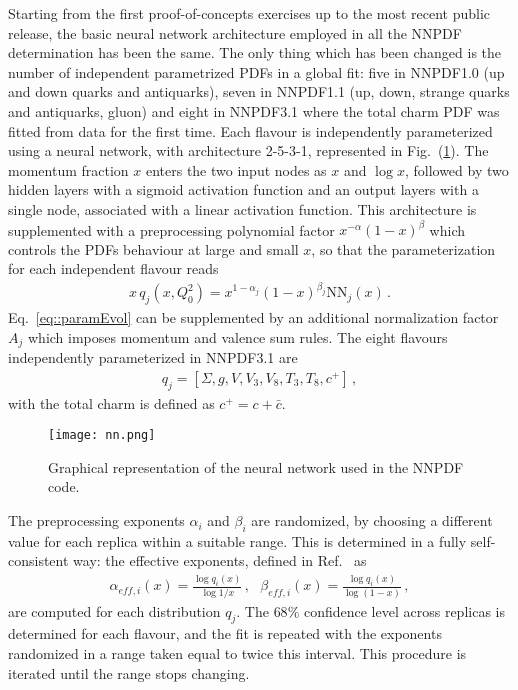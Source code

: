 %
Starting from the first proof-of-concepts exercises up to the most recent public release, the basic
neural network architecture employed in all the NNPDF determination has been the same.
The only thing which has been changed is the number of independent parametrized PDFs in a global fit:
five in NNPDF1.0 (up and down quarks and antiquarks), 
seven in NNPDF1.1 (up, down, strange quarks and antiquarks, gluon) and eight in NNPDF3.1
where the total charm PDF was fitted from data for the first time.
Each flavour is independently parameterized using a neural network,
with architecture 2-5-3-1, represented in Fig.~(\ref{nn}). 
The momentum fraction $x$ enters the two input nodes as $x$ and $\log{x}$, followed by two hidden layers with a sigmoid activation function and an output layers with a single node, 
associated with a linear activation function. 
This architecture is supplemented with a preprocessing polynomial factor $x^{-\alpha}\left(1-x\right)^{\beta}$ which controls the PDFs behaviour
at large and small $x$, so that the parameterization for each independent flavour reads
\begin{align}
	\label{eq::paramEvol}
	x\,q_j\left(x, Q_0^2\right) = x^{1-\alpha_{j}}\left(1-x\right)^{\beta_{j}}\text{NN}_{j}\left(x\right)\,.
\end{align}
Eq.~\eqref{eq::paramEvol} can be supplemented by an additional normalization factor $A_j$ which imposes momentum
and valence sum rules. The eight flavours independently parameterized in NNPDF3.1 are 
\begin{align}
    \label{eq:nnpdf31IC_basis}
    q_j = \left[\Sigma, g, V, V_3, V_8, T_3, T_8, c^+ \right]\,,
\end{align} 
with the total charm is defined as $c^+ = c +\bar{c}$.
\begin{figure}[htb]     
	\begin{center}
		\texttt{[image: nn.png]}
	\end{center}
	\caption{Graphical representation of the neural network used in the NNPDF code.}
	\label{nn}                 
\end{figure}
The preprocessing exponents $\alpha_i$ and $\beta_i$ are randomized, by choosing a different value for each replica
within a suitable range. This is determined in a fully self-consistent way: the effective exponents, defined in
Ref.~\cite{Ball:2014uwa} as 
\begin{align}
    \label{eq:effective_exp}
    \alpha_{eff,i}\left(x\right) = \frac{\log q_i\left(x\right)}{\log 1/x}\,, \,\,\,\,
    \beta_{eff,i}\left(x\right) = \frac{\log q_i\left(x\right)}{\log\left(1-x\right)}\,,
\end{align}
are computed for each distribution $q_j$. The $68\%$ confidence level across replicas
is determined for each flavour, and the fit is repeated with the exponents randomized in a range taken equal to twice this 
interval. This procedure is iterated until the range stops changing.


